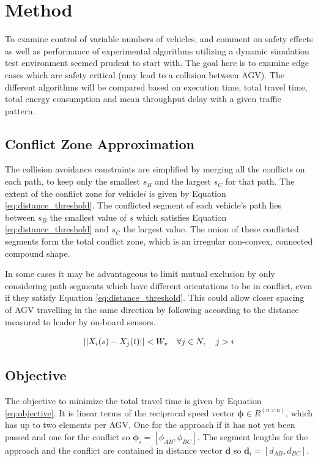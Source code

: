\section{Method}
To examine control of variable numbers of vehicles, and comment on safety effects as well as performance of experimental algorithms utilizing a dynamic simulation test environment seemed prudent to start with. The goal here is to examine edge cases which are safety critical (may lead to a collision between AGV). The different algorithms will be compared based on execution time, total travel time, total energy consumption and mean throughput delay with a given traffic pattern.

\subsection{Conflict Zone Approximation}
\label{sec:conflict_zone}
The collision avoidance constraints are simplified by merging all the conflicts on each path, to keep only the smallest $s_B$ and the largest $s_C$ for that path. The extent of the conflict zone for vehicle$i$ is given by Equation \ref{eq:distance_threshold}. The conflicted segment of each vehicle's path lies between $s_B$ the smallest value of $s$ which satisfies Equation \ref{eq:distance_threshold} and $s_C$ the largest value. The union of these conflicted segments form the total conflict zone, which is an irregular non-convex, connected compound shape. 

In some cases it may be advantageous to limit mutual exclusion by only considering path segments which have different orientations to be in conflict, even if they satisfy Equation \ref{eq:distance_threshold}. This could allow closer spacing of AGV travelling in the same direction by following according to the distance measured to leader by on-board sensors.

\begin{equation}
\label{eq:distance_threshold}
||X_i(s) - X_j(t)|| < W_v \quad \forall j \in N, \quad j>i\\
\end{equation}

\subsection{Objective}
The objective to minimize the total travel time is given by Equation \ref{eq:objective}. It is linear terms of the reciprocal speed vector $\bm{\phi} \in R^{(n \times n)}$, which has up to two elements per AGV. One for the approach if it has not yet been passed and one for the conflict so $\bm{\phi}_i = [\phi_{AB}, \phi_{BC}]$. The segment lengths for the approach and the conflict are contained in distance vector $\bm{d}$ so $\bm{d}_i =[d_{AB}, d_{BC}] $.

